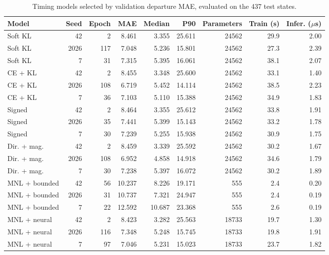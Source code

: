 \begin{table}[pos=htbp]
\centering\footnotesize
\caption{Timing models selected by validation departure MAE, evaluated on the 437 test states.}
\label{tab:departure_runs}
\setlength{\tabcolsep}{3pt}
\renewcommand{\arraystretch}{1.12}
\begin{tabular*}{\linewidth}{@{\extracolsep{\fill}}lrrrrrrrr@{}}
\toprule
Model & Seed & Epoch & MAE & Median & P90 & Parameters & Train (s) & Infer. ($\mu$s) \\
\midrule
Soft KL & 42 & 2 & 8.461 & 3.355 & 25.611 & 24562 & 29.9 & 2.00 \\
Soft KL & 2026 & 117 & 7.048 & 5.236 & 15.801 & 24562 & 27.3 & 2.39 \\
Soft KL & 7 & 31 & 7.315 & 5.395 & 16.061 & 24562 & 38.1 & 2.07 \\
CE + KL & 42 & 2 & 8.455 & 3.348 & 25.600 & 24562 & 33.1 & 1.40 \\
CE + KL & 2026 & 108 & 6.719 & 5.452 & 14.114 & 24562 & 38.5 & 2.23 \\
CE + KL & 7 & 36 & 7.103 & 5.110 & 15.388 & 24562 & 34.9 & 1.83 \\
Signed & 42 & 2 & 8.464 & 3.355 & 25.612 & 24562 & 33.8 & 1.91 \\
Signed & 2026 & 35 & 7.441 & 5.399 & 15.143 & 24562 & 33.2 & 1.78 \\
Signed & 7 & 30 & 7.239 & 5.255 & 15.938 & 24562 & 30.9 & 1.75 \\
Dir. + mag. & 42 & 2 & 8.459 & 3.339 & 25.592 & 24562 & 30.2 & 1.67 \\
Dir. + mag. & 2026 & 108 & 6.952 & 4.858 & 14.918 & 24562 & 34.6 & 1.79 \\
Dir. + mag. & 7 & 30 & 7.238 & 5.397 & 16.072 & 24562 & 30.2 & 1.89 \\
MNL + bounded & 42 & 56 & 10.237 & 8.226 & 19.171 & 555 & 2.4 & 0.20 \\
MNL + bounded & 2026 & 31 & 10.737 & 7.321 & 24.947 & 555 & 2.4 & 0.19 \\
MNL + bounded & 7 & 22 & 12.592 & 10.687 & 23.368 & 555 & 2.6 & 0.19 \\
MNL + neural & 42 & 2 & 8.423 & 3.282 & 25.563 & 18733 & 19.7 & 1.30 \\
MNL + neural & 2026 & 116 & 7.348 & 5.248 & 15.745 & 18733 & 19.8 & 1.91 \\
MNL + neural & 7 & 97 & 7.046 & 5.231 & 15.023 & 18733 & 23.7 & 1.82 \\
\bottomrule
\end{tabular*}
\par{}
\end{table}

